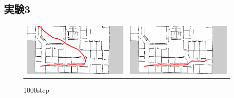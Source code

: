 \subsection*{実験3}
\begin{figure}[h]
  \begin{tabular}{cc}
    \begin{minipage}[h]{0.45\hsize}
      \centering
      \includegraphics[keepaspectratio, scale=0.3]{images/exp3_1000_4.png}
    \end{minipage} &
    \begin{minipage}[h]{0.45\hsize}
      \centering
      \includegraphics[keepaspectratio, scale=0.3]{images/exp3_1000_10.png}
    \end{minipage} \\
  \end{tabular}
   \caption*{1000step}
\end{figure}